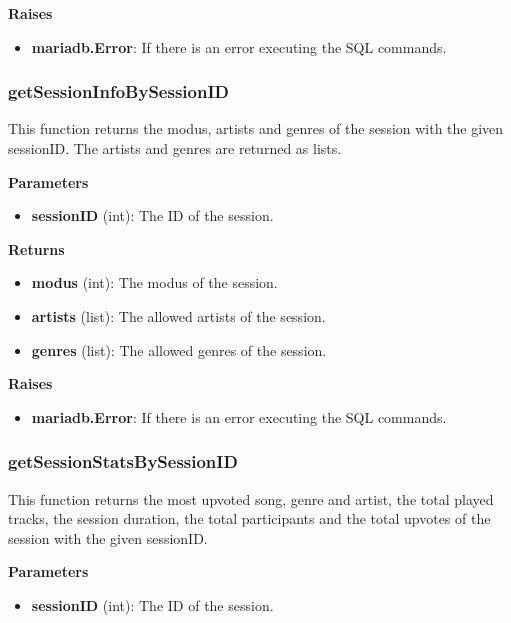 \documentclass[oneside, nenglish]{sdqtechreport}
\begin{document}
\begin{itemize}
\textbf{Raises}

\begin{itemize} \item \textbf{mariadb.Error}: If there is an error executing the SQL commands. \end{itemize}

\subsubsection{getSessionInfoBySessionID}

This function returns the modus, artists and genres of the session with the given sessionID. The artists and genres are returned as lists.

\textbf{Parameters}

\begin{itemize} \item \textbf{sessionID} (int): The ID of the session. \end{itemize}

\textbf{Returns}

\begin{itemize} \item \textbf{modus} (int): The modus of the session. \item \textbf{artists} (list): The allowed artists of the session. \item \textbf{genres} (list): The allowed genres of the session. \end{itemize}

\textbf{Raises}

\begin{itemize} \item \textbf{mariadb.Error}: If there is an error executing the SQL commands. \end{itemize}


\subsubsection{getSessionStatsBySessionID}

This function returns the most upvoted song, genre and artist, the total played tracks, the session duration, the total participants and the total upvotes of the session with the given sessionID.

\textbf{Parameters}

\begin{itemize}
    \item \textbf{sessionID} (int): The ID of the session.
\end{itemize}


\end{itemize}
\end{document}
